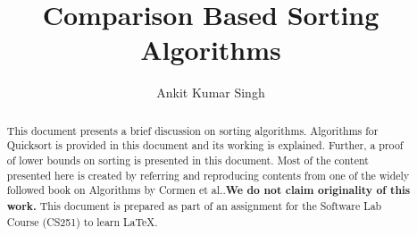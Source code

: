 \documentclass[a4paper,10pt,twocolumn]{article}
\title{Comparison Based Sorting Algorithms}
\author{Ankit Kumar Singh}
\date{}
\begin{document}
\maketitle
\begin{abstract}
    This document presents a brief  discussion on sorting algorithms.
    Algorithms for Quicksort is provided
    in this document and its working is explained.
    Further, a proof of lower bounds on sorting is presented
    in this document. Most of the content presented
    here is created by referring and reproducing
    contents from one of the widely followed book on
    Algorithms by Cormen et al.\cite{xen}.\textbf{We do not claim
    originality of this work.} This document is prepared
    as part of an assignment for the Software Lab
    Course (CS251) to learn \LaTeX.\\

\end{abstract}
\end{document}
